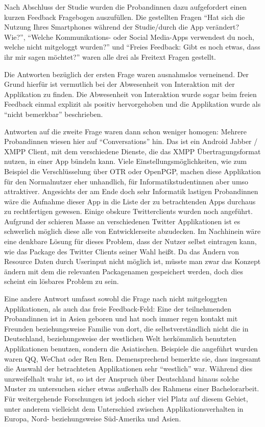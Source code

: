 Nach Abschluss der Studie wurden die Probandinnen dazu aufgefordert einen kurzen Feedback Fragebogen auszufüllen.
Die gestellten Fragen "`Hat sich die Nutzung Ihres Smartphones während der Studie/durch die App verändert? Wie?"', "`Welche Kommunikations- oder Social Media-Apps verwendest du noch, welche nicht mitgeloggt wurden?"' und "`Freies Feedback: Gibt es noch etwas, dass ihr mir sagen möchtet?"' waren alle drei als Freitext Fragen gestellt.
\par
Die Antworten bezüglich der ersten Frage waren ausnahmslos verneinend.
Der Grund hierfür ist vermutlich bei der Abwesenheit von Interaktion mit der Applikation zu finden.
Die Abwesenheit von Interaktion wurde sogar beim freien Feedback einmal explizit als positiv hervorgehoben und die Applikation wurde als "`nicht bemerkbar"' beschrieben.
\par
Antworten auf die zweite Frage waren dann schon weniger homogen:
Mehrere Probandinnen wiesen hier auf "`Conversations"' hin. 
Das ist ein Android Jabber / XMPP Client, mit dem verschiedene Dienste, die das XMPP Übertragungsformat nutzen, in einer App bündeln kann.
Viele Einstellungsmöglichkeiten, wie zum Beispiel die Verschlüsselung über OTR oder OpenPGP, machen diese Applikation für den Normalnutzer eher unhandlich, für Informatikstudentinnen aber umso attraktiver.
Angesichts der am Ende doch sehr Informatik lastigen Probandinnen wäre die Aufnahme dieser App in die Liste der zu betrachtenden Apps durchaus zu rechtfertigen gewesen.
Einige obskure Twitterclients wurden noch angeführt.
Aufgrund der schieren Masse an verschiedenen Twitter Applikationen ist es schwerlich möglich diese alle von Entwicklerseite abzudecken. 
Im Nachhinein wäre eine denkbare Lösung für dieses Problem, dass der Nutzer selbst eintragen kann, wie das Package des Twitter Clients seiner Wahl heißt.
Da das Ändern von Resource Daten durch Userinput nicht möglich ist, müsste man zwar das Konzept ändern mit dem die relevanten Packagenamen gespeichert werden, doch dies scheint ein lösbares Problem zu sein.
\par
Eine andere Antwort umfasst sowohl die Frage nach nicht mitgeloggten Applikationen, als auch das freie Feedback-Feld:
Eine der teilnehmenden Probandinnen ist in Asien geboren und hat noch immer regen kontakt mit Freunden beziehungsweise Familie von dort, 
die selbstverständlich nicht die in Deutschland, beziehungsweise der westlichen Welt herkömmlich benutzten Applikationen benutzen, sondern die Asiatischen.
Beispiele die angeführt wurden waren QQ, WeChat oder Ren Ren.
Demensprechend bemerkte sie, dass insgesamt die Auswahl der betrachteten Applikationen sehr "`westlich"' war.
Während dies unzweifelhalt wahr ist, so ist der Anspruch über Deutschland hinaus solche Muster zu untersuchen sicher etwas außerhalb des Rahmens einer Bachelorarbeit.
Für weitergehende Forschungen ist jedoch sicher viel Platz auf diesem Gebiet, unter anderem vielleicht dem Unterschied zwischen Applikationsverhalten in Europa, Nord- beziehungsweise Süd-Amerika und Asien. 
\par

